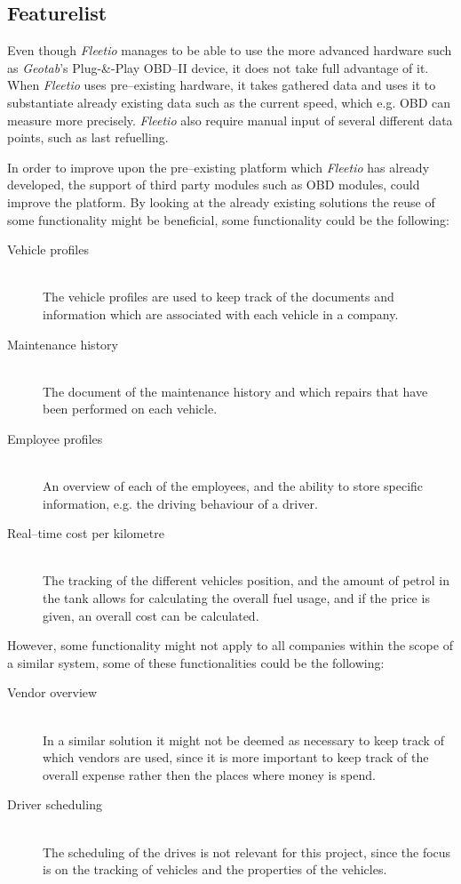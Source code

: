 \subsection{Featurelist}
Even though \textit{Fleetio} manages to be able to use the more advanced hardware such as \textit{Geotab}'s Plug-\&-Play OBD--II device, it does not take full advantage of it.
When \textit{Fleetio} uses pre--existing hardware, it takes gathered data and uses it to substantiate already existing data such as the current speed, which e.g. \ac{OBD} can measure more precisely.
\textit{Fleetio} also require manual input of several different data points, such as last refuelling.

In order to improve upon the pre--existing platform which \textit{Fleetio} has already developed, the support of third party modules such as \ac{OBD} modules, could improve the platform.
By looking at the already existing solutions the reuse of some functionality might be beneficial, some functionality could be the following:
\begin{description}
    \item[Vehicle profiles] \hfill \\
    The vehicle profiles are used to keep track of the documents and information which are associated with each vehicle in a company.
    \item[Maintenance history] \hfill \\
    The document of the maintenance history and which repairs that have been performed on each vehicle.
    \item[Employee profiles] \hfill \\
    An overview of each of the employees, and the ability to store specific information, e.g. the driving behaviour of a driver.
    \item[Real--time cost per kilometre] \hfill \\
    The tracking of the different vehicles position, and the amount of petrol in the tank allows for calculating the overall fuel usage, and if the price is given, an overall cost can be calculated.
\end{description}

However, some functionality might not apply to all companies within the scope of a similar system, some of these functionalities could be the following:
\begin{description}
    \item[Vendor overview] \hfill \\
    In a similar solution it might not be deemed as necessary to keep track of which vendors are used, since it is more important to keep track of the overall expense rather then the places where money is spend.
    \item[Driver scheduling] \hfill \\
    The scheduling of the drives is not relevant for this project, since the focus is on the tracking of vehicles and the properties of the vehicles.
\end{description}

